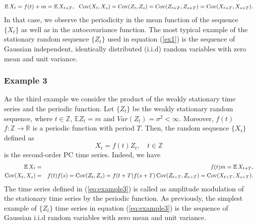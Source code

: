 \begin{eqnarray}
\operatorname{\mathbb{E}} X_t=f(t)+m=\operatorname{\mathbb{E}} X_{t+T},~~\operatorname{Cov}(X_t,X_s)=\operatorname{Cov}(Z_t,Z_s)=\operatorname{Cov}(Z_{t+T},Z_{s+T})=\operatorname{Cov}(X_{t+T},X_{s+T}).\end{eqnarray}
In that case, we observe the periodicity in the mean function of the sequence $\{X_t\}$ as well as in the autocovariance function. The most typical example of the stationary random sequence $\{Z_t\}$ used in equation (\ref{ex1}) is the sequence of Gaussian independent, identically distributed (i.i.d) random variables with zero mean and unit variance.
\subsubsection*{Example 3}
As the third example we consider the product of the weakly stationary time series and the periodic function.  Let $\{Z_t\}$ be the weakly stationary random sequence, where $t\in\mathbb{Z}$, $\mathbb{E}Z_t=m$ and $Var(Z_t)=\sigma ^2<\infty$. Moreover, $f(t)$ $f:\mathbb{Z}\rightarrow \mathbb{R}$ is a periodic function  with period $T$. Then, the random sequence $\{X_t\}$ defined as
\begin{equation}
\label{eq:example3}
    X_t=f(t)Z_t, \quad t\in \mathbb{Z}
\end{equation}
is the second-order PC time series. Indeed, we have
\begin{eqnarray}\operatorname{\mathbb{E}} X_t&=&f(t)m=\operatorname{\mathbb{E}} X_{t+T},\\\operatorname{Cov}(X_t,X_s)&=&f(t)f(s)=\operatorname{Cov}(Z_t,Z_s)=f(t+T)f(s+T)\operatorname{Cov}(Z_{t+T},Z_{s+T})=\operatorname{Cov}(X_{t+T},X_{s+T}).\nonumber\end{eqnarray}
The time series defined in (\ref{eq:example3}) is called as amplitude modulation of the stationary time series by the periodic function. As previously, the simplest example of  $\{Z_t\}$ time series in equation (\ref{eq:example3}) is the sequence of  Gaussian i.i.d random variables with zero mean and unit variance.
